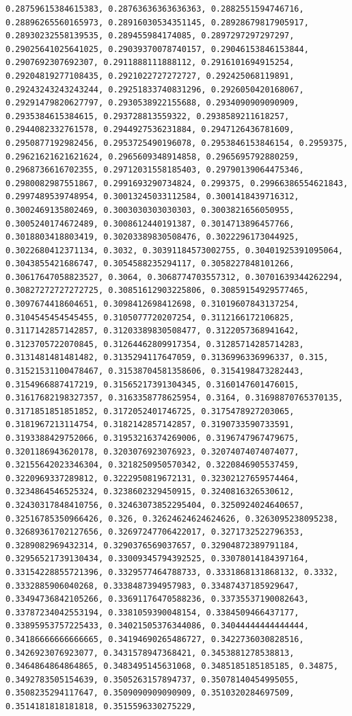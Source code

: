 \documentclass[11pt]{article}
\begin{document}
\begin{Verbatim}[commandchars=\\\{\}]
0.28759615384615383, 0.28763636363636363, 0.2882551594746716, 0.28896265560165973, 0.28916030534351145, 0.28928679817905917, 0.28930232558139535, 0.289455984174085, 0.2897297297297297, 0.29025641025641025, 0.29039370078740157, 0.29046153846153844, 0.2907692307692307, 0.2911888111888112, 0.2916101694915254, 0.29204819277108435, 0.2921022727272727, 0.292425068119891, 0.29243243243243244, 0.29251833740831296, 0.2926050420168067, 0.29291479820627797, 0.2930538922155688, 0.2934090909090909, 0.2935384615384615, 0.293728813559322, 0.2938589211618257, 0.2944082332761578, 0.2944927536231884, 0.2947126436781609, 0.2950877192982456, 0.2953725490196078, 0.2953846153846154, 0.2959375, 0.29621621621621624, 0.2965609348914858, 0.2965695792880259, 0.2968736616702355, 0.29712031558185403, 0.29790139064475346, 0.2980082987551867, 0.2991693290734824, 0.299375, 0.29966386554621843, 0.2997489539748954, 0.30013245033112584, 0.3001418439716312, 0.3002469135802469, 0.3003030303030303, 0.3003821656050955, 0.3005240174672489, 0.3008612440191387, 0.3014713896457766, 0.3018803418803419, 0.30203389830508476, 0.3022296173044925, 0.3022680412371134, 0.3032, 0.30391184573002755, 0.30401925391095064, 0.3043855421686747, 0.3054588235294117, 0.3058227848101266, 0.30617647058823527, 0.3064, 0.3068774703557312, 0.30701639344262294, 0.30827272727272725, 0.30851612903225806, 0.30859154929577465, 0.3097674418604651, 0.3098412698412698, 0.31019607843137254, 0.3104545454545455, 0.3105077720207254, 0.3112166172106825, 0.3117142857142857, 0.31203389830508477, 0.3122057368941642, 0.3123705722070845, 0.31264462809917354, 0.31285714285714283, 0.3131481481481482, 0.3135294117647059, 0.3136996336996337, 0.315, 0.31521531100478467, 0.31538704581358606, 0.3154198473282443, 0.3154966887417219, 0.31565217391304345, 0.3160147601476015, 0.31617682198327357, 0.3163358778625954, 0.3164, 0.31698870765370135, 0.3171851851851852, 0.3172052401746725, 0.3175478927203065, 0.3181967213114754, 0.3182142857142857, 0.3190733590733591, 0.3193388429752066, 0.31953216374269006, 0.3196747967479675, 0.3201186943620178, 0.3203076923076923, 0.32074074074074077, 0.32155642023346304, 0.3218250950570342, 0.3220846905537459, 0.3220969337289812, 0.3222950819672131, 0.32302127659574464, 0.3234864546525324, 0.3238602329450915, 0.3240816326530612, 0.32430317848410756, 0.32463073852295404, 0.3250924024640657, 0.32516785350966426, 0.326, 0.32624624624624626, 0.3263095238095238, 0.32689361702127656, 0.32697247706422017, 0.3271732522796353, 0.3289082969432314, 0.3290376569037657, 0.32904872389791184, 0.32956521739130434, 0.33009345794392525, 0.33078014184397164, 0.33154228855721396, 0.3329577464788733, 0.3331868131868132, 0.3332, 0.3332885906040268, 0.3338487394957983, 0.33487437185929647, 0.33494736842105266, 0.33691176470588236, 0.33735537190082643, 0.33787234042553194, 0.3381059390048154, 0.3384509466437177, 0.33895953757225433, 0.34021505376344086, 0.34044444444444444, 0.34186666666666665, 0.34194690265486727, 0.3422736030828516, 0.3426923076923077, 0.3431578947368421, 0.3453881278538813, 0.3464864864864865, 0.3483495145631068, 0.3485185185185185, 0.34875, 0.3492783505154639, 0.3505263157894737, 0.35078140454995055, 0.3508235294117647, 0.3509090909090909, 0.3510320284697509, 0.3514181818181818, 0.3515596330275229, 
\end{Verbatim}
\end{document}
